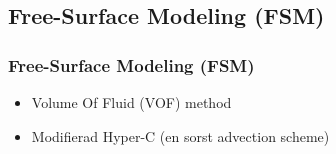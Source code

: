 \subsection{Free-Surface Modeling (FSM)}
\begin{frame}[<+(1)->]
\frametitle{Free-Surface Modeling (FSM)}

\begin{itemize}
\item Volume Of Fluid (VOF) method
\item Modifierad Hyper-C (en sorst advection scheme)
\end{itemize}

\end{frame}